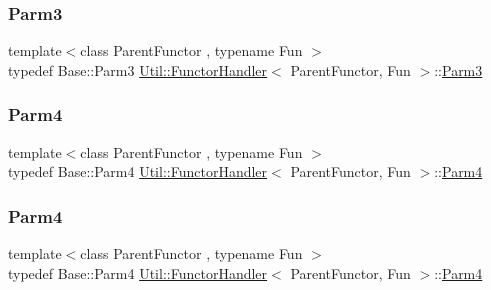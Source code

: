 \mbox{\label{classUtil_1_1FunctorHandler_a25f1b9dd7890c1dbc68abc686f30bec8}} 
\subsubsection{\texorpdfstring{Parm3}{Parm3}\hspace{0.1cm}{\footnotesize\ttfamily [2/2]}}
{\footnotesize\ttfamily template$<$class Parent\+Functor , typename Fun $>$ \\
typedef Base\+::\+Parm3 \mbox{\hyperlink{classUtil_1_1FunctorHandler}{Util\+::\+Functor\+Handler}}$<$ Parent\+Functor, Fun $>$\+::\mbox{\hyperlink{classUtil_1_1FunctorHandler_a25f1b9dd7890c1dbc68abc686f30bec8}{Parm3}}}

\mbox{\label{classUtil_1_1FunctorHandler_a2e8ca7556b379684e9b76029e77dd644}} 
\subsubsection{\texorpdfstring{Parm4}{Parm4}\hspace{0.1cm}{\footnotesize\ttfamily [1/2]}}
{\footnotesize\ttfamily template$<$class Parent\+Functor , typename Fun $>$ \\
typedef Base\+::\+Parm4 \mbox{\hyperlink{classUtil_1_1FunctorHandler}{Util\+::\+Functor\+Handler}}$<$ Parent\+Functor, Fun $>$\+::\mbox{\hyperlink{classUtil_1_1FunctorHandler_a2e8ca7556b379684e9b76029e77dd644}{Parm4}}}

\mbox{\label{classUtil_1_1FunctorHandler_a2e8ca7556b379684e9b76029e77dd644}} 
\subsubsection{\texorpdfstring{Parm4}{Parm4}\hspace{0.1cm}{\footnotesize\ttfamily [2/2]}}
{\footnotesize\ttfamily template$<$class Parent\+Functor , typename Fun $>$ \\
typedef Base\+::\+Parm4 \mbox{\hyperlink{classUtil_1_1FunctorHandler}{Util\+::\+Functor\+Handler}}$<$ Parent\+Functor, Fun $>$\+::\mbox{\hyperlink{classUtil_1_1FunctorHandler_a2e8ca7556b379684e9b76029e77dd644}{Parm4}}}

